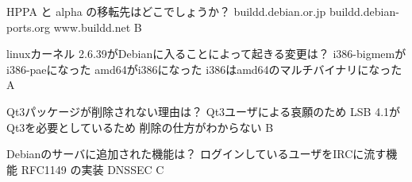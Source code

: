 %

\santaku
{HPPA と alpha の移転先はどこでしょうか？}
{buildd.debian.or.jp}
{buildd.debian-ports.org}
{www.buildd.net}
{B}
{}

\santaku
{linuxカーネル 2.6.39がDebianに入ることによって起きる変更は？}
{i386-bigmemがi386-paeになった}
{amd64がi386になった}
{i386はamd64のマルチバイナリになった}
{A}
{}

\santaku
{Qt3パッケージが削除されない理由は？}
{Qt3ユーザによる哀願のため}
{LSB 4.1がQt3を必要としているため}
{削除の仕方がわからない}
{B}
{}

\santaku
{Debianのサーバに追加された機能は？}
{ログインしているユーザをIRCに流す機能}
{RFC1149 の実装}
{DNSSEC}
{C}
{}
